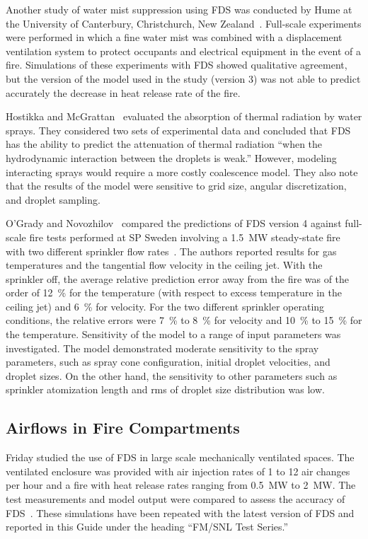 Another study  of water  mist suppression using  FDS was  conducted by Hume   at   the    University   of   Canterbury,   Christchurch,   New
Zealand~\cite{Hume:Masters}. Full-scale  experiments were performed in which a fine  water mist was combined with  a displacement ventilation system
to protect occupants and electrical equipment in the event of a fire.  Simulations of  these experiments  with FDS  showed qualitative agreement, but
the version of the  model used in the study (version 3) was not able  to predict accurately the decrease  in heat release rate of the fire.

Hostikka    and   McGrattan~\cite{Hostikka:FSJ2006}    evaluated   the absorption of  thermal radiation by water sprays.  They considered two sets of
experimental data and concluded  that FDS has  the ability to predict the  attenuation of thermal radiation  ``when the hydrodynamic interaction
between   the  droplets  is   weak.''  However,  modeling interacting sprays would require a more costly coalescence model. They also note that  the
results of the model were  sensitive to grid size, angular discretization, and droplet sampling.

O'Grady and Novozhilov~\cite{O'Grady:CST} compared the predictions of FDS version 4 
against full-scale fire tests performed at SP Sweden involving a 1.5~MW steady-state fire with two different
sprinkler flow rates~\cite{Ingason:1}. 
The authors reported results for gas temperatures and the tangential flow velocity in the
ceiling jet. With the sprinkler off, the average relative prediction error away from the fire
was of the order of 12~\% for the temperature (with respect to excess temperature in the
ceiling jet) and 6~\% for velocity. For the two different sprinkler operating conditions,
the relative errors were 7~\% to 8~\% for velocity and 10~\% to 15~\% for the temperature. 
Sensitivity of the model to a range of input parameters was investigated.
The model demonstrated moderate sensitivity to the spray parameters,
such as spray cone configuration, initial droplet velocities, and droplet sizes.  
On the other hand, the sensitivity to other parameters such as
sprinkler atomization length and rms of droplet size distribution was low.



\subsection{Airflows in Fire Compartments}

Friday studied the  use of FDS in large  scale mechanically ventilated spaces.   The ventilated  enclosure  was provided  with air  injection rates
of  1 to 12 air  changes per hour  and a fire with  heat release rates ranging  from 0.5~MW to  2~MW.  The test measurements  and model output were
compared to assess the accuracy of FDS~\cite{Friday:1}. These simulations have been repeated with the latest version of FDS and reported in this Guide under
the heading ``FM/SNL Test Series.''

